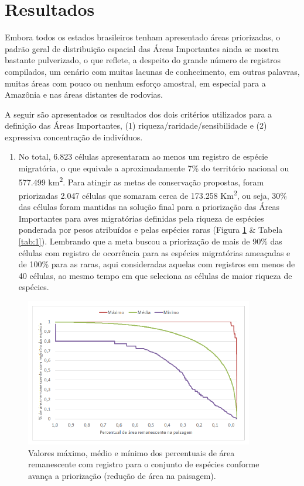 \documentclass[
  oneside]{scrbook}
\providecommand{\tightlist}{%
  \setlength{\itemsep}{0pt}\setlength{\parskip}{0pt}}
\begin{document}
\hypertarget{resultados}{%
\section{Resultados}\label{resultados}}

Embora todos os estados brasileiros tenham apresentado áreas priorizadas, o padrão geral de distribuição espacial das Áreas Importantes ainda se mostra bastante pulverizado, o que reflete, a despeito do grande número de registros compilados, um cenário com muitas lacunas de conhecimento, em outras palavras, muitas áreas com pouco ou nenhum esforço amostral, em especial para a Amazônia e nas áreas distantes de rodovias.

A seguir são apresentados os resultados dos dois critérios utilizados para a definição das Áreas Importantes, (1) riqueza/raridade/sensibilidade e (2) expressiva concentração de indivíduos.

\begin{enumerate}
\def\labelenumi{(\arabic{enumi})}
\tightlist
\item
  No total, 6.823 células apresentaram ao menos um registro de espécie migratória, o que equivale a aproximadamente 7\% do território nacional ou 577.499 km\textsuperscript{2}. Para atingir as metas de conservação propostas, foram priorizadas 2.047 células que somaram cerca de 173.258 Km\textsuperscript{2}, ou seja, 30\% das células foram mantidas na solução final para a priorização das Áreas Importantes para aves migratórias definidas pela riqueza de espécies ponderada por pesos atribuídos e pelas espécies raras (Figura \ref{fig:01} \& Tabela \ref{tab:1}). Lembrando que a meta buscou a priorização de mais de 90\% das células com registro de ocorrência para as espécies migratórias ameaçadas e de 100\% para as raras, aqui consideradas aquelas com registros em menos de 40 células, ao mesmo tempo em que seleciona as células de maior riqueza de espécies.
\end{enumerate}

\begin{figure}

{\centering \includegraphics[width=0.8\linewidth]{imagens/figura01} 

}

\caption{Valores máximo, médio e mínimo dos percentuais de área remanescente com registro para o conjunto de espécies conforme avança a priorização (redução de área na paisagem).}\label{fig:01}
\end{figure}
\end{document}
